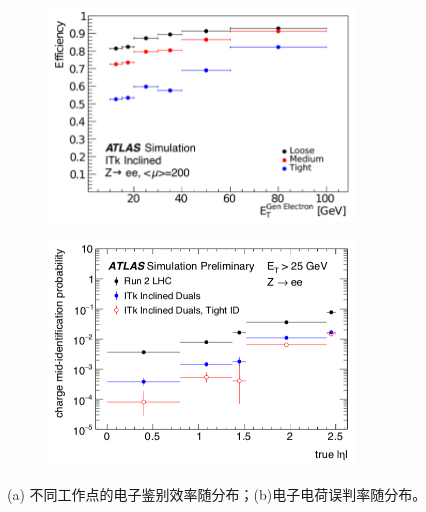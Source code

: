 \begin{figure}[h]
\centering
\begin{subfigure}[b]{0.45\textwidth}
\centering
 \includegraphics[width=0.9\textwidth]{fig/ITk_ele_qmisid1.png}
 \caption{}
\end{subfigure}
\begin{subfigure}[b]{0.45\textwidth}
\centering
 \includegraphics[width=0.9\textwidth]{fig/ITk_ele_qmisid2.png}
 \caption{}
\end{subfigure}
\caption{(a) 不同工作点的电子鉴别效率随\et 分布；(b)电子电荷误判率随\abseta 分布。\cite{ATL-PHYS-PUB-2019-005}}
\label{fig:ITk_ele_qmisid}
\end{figure}

